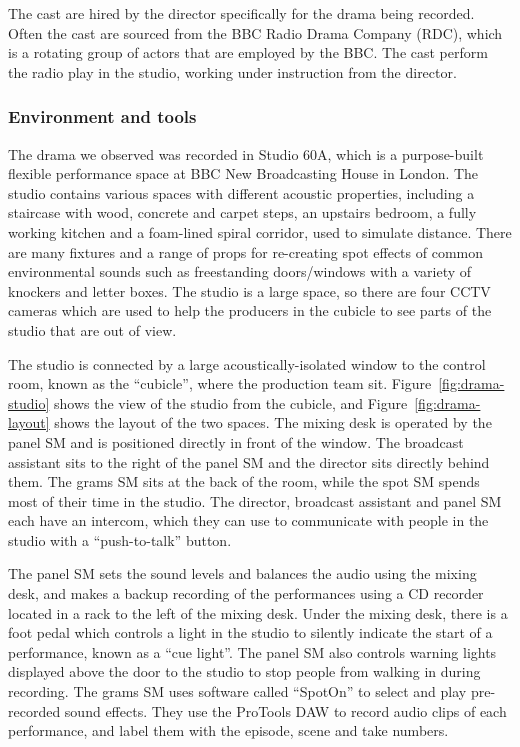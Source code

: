 The cast are hired by the director specifically for the drama being recorded. Often the cast are sourced from the BBC
Radio Drama Company (RDC), which is a rotating group of actors that are employed by the BBC. The cast perform the
radio play in the studio, working under instruction from the director.

\subsubsection{Environment and tools}
The drama we observed was recorded in Studio 60A, which is a purpose-built flexible performance space at BBC New
Broadcasting House in London. The studio contains various spaces with different acoustic properties, including a
staircase with wood, concrete and carpet steps, an upstairs bedroom, a fully working kitchen and a foam-lined spiral
corridor, used to simulate distance.  There are many fixtures and a range of props for re-creating spot effects of
common environmental sounds such as freestanding doors/windows with a variety of knockers and letter boxes. The studio
is a large space, so there are four CCTV cameras which are used to help the producers in the cubicle to see parts of
the studio that are out of view. 

The studio is connected by a large acoustically-isolated window to the control room, known as the ``cubicle'', where
the production team sit.  Figure~\ref{fig:drama-studio} shows the view of the studio from the cubicle, and
Figure~\ref{fig:drama-layout} shows the layout of the two spaces. The mixing desk is operated by the panel SM and is
positioned directly in front of the window.  The broadcast assistant sits to the right of the panel SM and the director
sits directly behind them. The grams SM sits at the back of the room, while the spot SM spends most of their time in
the studio.  The director, broadcast assistant and panel SM each have an intercom, which they can use to communicate
with people in the studio with a ``push-to-talk'' button.

The panel SM sets the sound levels and balances the audio using the mixing desk, and makes a backup recording of the
performances using a CD recorder located in a rack to the left of the mixing desk.  Under the mixing desk, there is a
foot pedal which controls a light in the studio to silently indicate the start of a performance, known as a ``cue
light''. The panel SM also controls warning lights displayed above the door to the studio to stop people from walking
in during recording.  The grams SM uses software called ``SpotOn'' to select and play pre-recorded sound effects. They
use the ProTools DAW to record audio clips of each performance, and label them with the episode, scene and take numbers.

